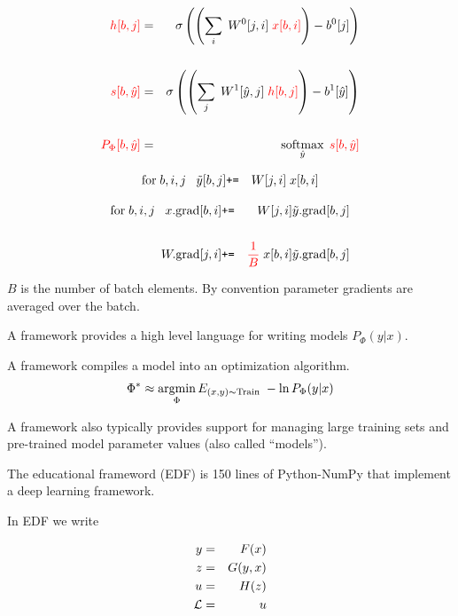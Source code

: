 {\vfill
\begin{eqnarray*}
  {\color{red} h[b,j]} & = & \sigma\left(\left(\sum_i\;W^0[j,i] \;{\color{red} x[b,i]}\right) - b^0[j]\right) \\
  \\
  {\color{red} s[b,\hat{y}]} & = & \sigma\left(\left(\sum_j\;W^1[\hat{y},j]\;{\color{red} h[b,j]}\right) - b^1[\hat{y}]\right) \\
  \\
  {\color{red} P_\Phi[b,\hat{y}]} & = & \operatorname*{softmax}_{\hat{y}}\;{\color{red} s[b,\hat{y}]}
\end{eqnarray*}

\vspace{-3ex}
\begin{eqnarray*}
  \mathrm{for}\;b,i,j\;\;\;\tilde{y}[b,j] & \mbox{\tt +=} & W[j,i]\;x[b,i]
\end{eqnarray*}

\begin{eqnarray*}
\mathrm{for}\;b,i,j\;\;\;  x.\mathrm{grad}[b,i] & \mbox{\tt +=} & W[j,i]\tilde{y}.\mathrm{grad}[b,j] \\
  \\
  W.\mathrm{grad}[j,i] & \mbox{\tt +=} & {\color{red} \frac{1}{B}}\;x[b,i]\tilde{y}.\mathrm{grad}[b,j]
\end{eqnarray*}

\vfill
$B$ is the number of batch elements.  By convention parameter gradients are averaged over the batch.

A framework provides a high level language for writing models $P_\Phi(y|x)$.

\vfill
A framework compiles a model into an optimization algorithm.
\vfill
{\color{red} $$\Phi^* \approx \operatorname*{argmin}_\Phi E_{(x,y) \sim \mathrm{Train}} \; -\ln P_\Phi(y|x)$$}

\vfill
A framework also typically provides support for managing large training sets and pre-trained model parameter values (also called ``models'').


The educational frameword (EDF) is 150 lines of Python-NumPy that implement a deep learning framework.

\vfill
In EDF we write

\vfill
\begin{eqnarray*}
  y & = & F(x) \\
  z & = & G(y,x) \\
  u & = & H(z) \\
  {\cal L} &  = &  u
\end{eqnarray*}
\medskip

}
